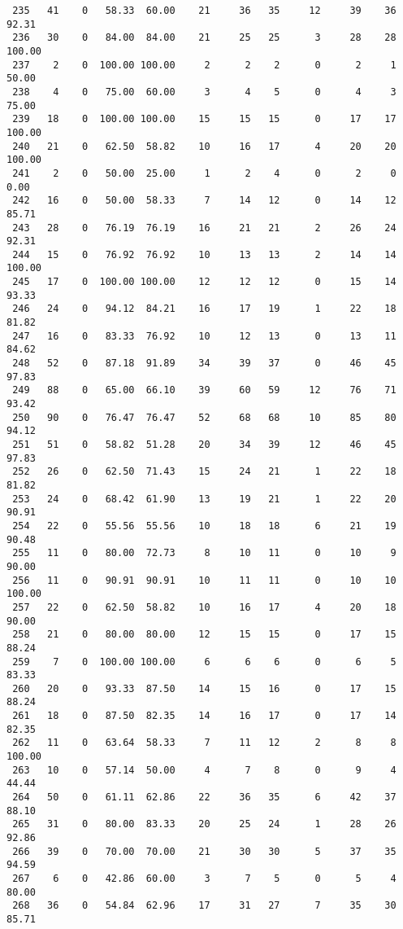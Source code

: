 \begin{verbatim}
 235   41    0   58.33  60.00    21     36   35     12     39    36    92.31
 236   30    0   84.00  84.00    21     25   25      3     28    28   100.00
 237    2    0  100.00 100.00     2      2    2      0      2     1    50.00
 238    4    0   75.00  60.00     3      4    5      0      4     3    75.00
 239   18    0  100.00 100.00    15     15   15      0     17    17   100.00
 240   21    0   62.50  58.82    10     16   17      4     20    20   100.00
 241    2    0   50.00  25.00     1      2    4      0      2     0     0.00
 242   16    0   50.00  58.33     7     14   12      0     14    12    85.71
 243   28    0   76.19  76.19    16     21   21      2     26    24    92.31
 244   15    0   76.92  76.92    10     13   13      2     14    14   100.00
 245   17    0  100.00 100.00    12     12   12      0     15    14    93.33
 246   24    0   94.12  84.21    16     17   19      1     22    18    81.82
 247   16    0   83.33  76.92    10     12   13      0     13    11    84.62
 248   52    0   87.18  91.89    34     39   37      0     46    45    97.83
 249   88    0   65.00  66.10    39     60   59     12     76    71    93.42
 250   90    0   76.47  76.47    52     68   68     10     85    80    94.12
 251   51    0   58.82  51.28    20     34   39     12     46    45    97.83
 252   26    0   62.50  71.43    15     24   21      1     22    18    81.82
 253   24    0   68.42  61.90    13     19   21      1     22    20    90.91
 254   22    0   55.56  55.56    10     18   18      6     21    19    90.48
 255   11    0   80.00  72.73     8     10   11      0     10     9    90.00
 256   11    0   90.91  90.91    10     11   11      0     10    10   100.00
 257   22    0   62.50  58.82    10     16   17      4     20    18    90.00
 258   21    0   80.00  80.00    12     15   15      0     17    15    88.24
 259    7    0  100.00 100.00     6      6    6      0      6     5    83.33
 260   20    0   93.33  87.50    14     15   16      0     17    15    88.24
 261   18    0   87.50  82.35    14     16   17      0     17    14    82.35
 262   11    0   63.64  58.33     7     11   12      2      8     8   100.00
 263   10    0   57.14  50.00     4      7    8      0      9     4    44.44
 264   50    0   61.11  62.86    22     36   35      6     42    37    88.10
 265   31    0   80.00  83.33    20     25   24      1     28    26    92.86
 266   39    0   70.00  70.00    21     30   30      5     37    35    94.59
 267    6    0   42.86  60.00     3      7    5      0      5     4    80.00
 268   36    0   54.84  62.96    17     31   27      7     35    30    85.71

\end{verbatim}

